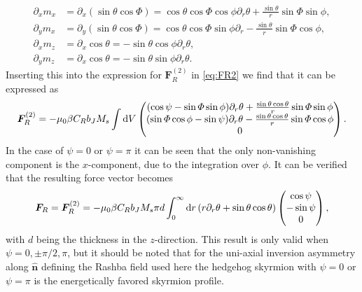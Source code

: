 \begin{subequations}
\begin{align}
    \partial_x m_x &= \partial_x(\sin\theta\cos\Phi) = \cos\theta\cos\Phi\cos\phi\partial_r\theta + \frac{\sin\theta}{r}\sin\Phi\sin\phi, \\
    \partial_y m_x &= \partial_y(\sin\theta\cos\Phi) = \cos\theta\cos\Phi\sin\phi\partial_r - \frac{\sin\theta}{r}\sin\Phi\cos\phi, \\
    \partial_x m_z &= \partial_x\cos\theta = -\sin\theta\cos\phi\partial_r\theta, \\
    \partial_y m_z &= \partial_x\cos\theta = -\sin\theta\sin\phi\partial_r\theta.
\end{align}
\end{subequations}
Inserting this into the expression for $\mathbold{F}_R^{(2)}$ in \eqref{eq:FR2} we find that it can be expressed as
\begin{align}
    \mathbold{F}_R^{(2)} = -\mu_0\beta C_Rb_J M_s\int\d V
    \begin{pmatrix}
    (\cos\psi-\sin\Phi\sin\phi)\partial_r\theta+\frac{\sin\theta\cos\theta}{r}\sin\Phi\sin\phi \\
    (\sin\Phi\cos\phi-\sin\psi)\partial_r\theta-\frac{\sin\theta\cos\theta}{r}\sin\Phi\cos\phi \\
    0
    \end{pmatrix}.
\end{align}
In the case of $\psi =0$ or $\psi = \pi$ it can be seen that the only non-vanishing component is the $x$-component, due to the integration over $\phi$. It can be verified that the resulting force vector becomes
\begin{align}
    \mathbold{F}_R=\mathbold{F}_R^{(2)} = -\mu_0\beta C_Rb_J M_s\pi d\int_0^{\infty}\d r\left(r\partial_r\theta + \sin\theta\cos\theta\right)
    \begin{pmatrix}
    \cos\psi \\
    -\sin\psi \\
    0
    \end{pmatrix},
\end{align}
with $d$ being the thickness in the $z$-direction. This result is only valid when $\psi = 0, \pm\pi/2, \pi$, but it should be noted that for the uni-axial inversion asymmetry along $\mathbold{\hat{n}}$ defining the Rashba field used here the hedgehog skyrmion with $\psi=0$ or $\psi=\pi$ is the energetically favored skyrmion profile.




